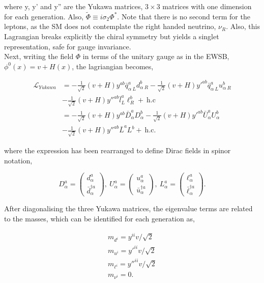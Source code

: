 where y, y' and y'' are the Yukawa matrices, $3\times3$ matrices with one dimension for each generation. Also, $\tilde{\Phi}\equiv i\sigma_2\Phi^*$. Note that there is no second term for the leptons, as the SM does not contemplate the right handed neutrino, $\nu_R$. Also, this Lagrangian breaks explicitly the chiral symmetry but yields a singlet representation, safe for gauge invariance.\\

Next, writing the field $\Phi$ in terms of the unitary gauge as in the EWSB, $\phi^0(x)=v+H(x)$, the lagriangian becomes,

\begin{equation}
\begin{split}
    \mathcal{L}_{Yukawa} &= -\frac{1}{\sqrt{2}}(v+H)y^{ab}\bar{q}^a_{\alpha\ L} d^b_{\alpha\ R} - \frac{1}{\sqrt{2}}(v+H)y'^{ab}\bar{q}^a_{\alpha\ L}u^b_{\alpha\ R}\\
    &-\frac{1}{\sqrt{2}}(v+H)y''^{ab}\bar{l}^a_{L}\ell^b_{R}+\ \text{h.c}\\
    &=-\frac{1}{\sqrt{2}}(v+H)y^{ab} \bar{D}^a_\alpha D^b_\alpha - \frac{1}{\sqrt{2}}(v+H)y'^{ab}\bar{U}^a_\alpha U^b_\alpha\\
    &-\frac{1}{\sqrt{2}}(v+H)y''^{ab}\bar{L}^a L^b+\ \text{h.c}.
\end{split}
\end{equation}

where the expression has been rearranged to define Dirac fields in spinor notation,

\begin{equation}
\label{Theory_eq:Diracmassspace}
    D_\alpha^a = \begin{pmatrix} d_\alpha^a \\ \bar{d}^{\dag a}_\alpha \end{pmatrix},\ 
    U_\alpha^a = \begin{pmatrix} u_\alpha^a \\ \bar{u}^{\dag a}_\alpha \end{pmatrix},\ 
    L_\alpha^a = \begin{pmatrix} \ell_\alpha^a \\ \bar{\ell}^{\dag a}_\alpha \end{pmatrix}.
\end{equation}

After diagonalising the three Yukawa matrices, the eigenvalue terms are related to the masses, which can be identified for each generation as,

\begin{equation}
\begin{split}
m_{d^i} = y^{ii}v/\sqrt{2} \\ 
m_{u^i} = y'^{ii}v/\sqrt{2} \\
m_{\ell^i} = y''^{ii}v/\sqrt{2} \\
m_{\nu^i} = 0.
\end{split}
\label{Theory_eq:yukawacouplings}
\end{equation}


